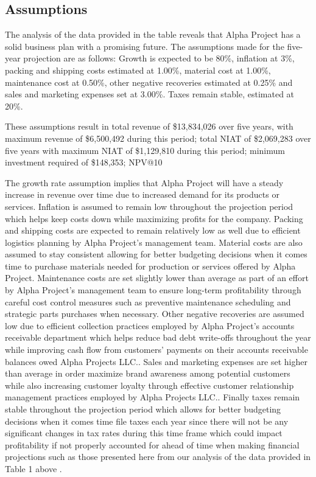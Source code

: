 

\subsection{Assumptions}\label{sec:assumptions}
The analysis of the data provided in the table reveals that Alpha Project has a solid business plan with a promising future. The assumptions made for the five-year projection are as follows: Growth is expected to be 80\%, inflation at 3\%, packing and shipping costs estimated at 1.00\%, material cost at 1.00\%, maintenance cost at 0.50\%, other negative recoveries estimated at 0.25\% and sales and marketing expenses set at 3.00\%. Taxes remain stable, estimated at 20\%. 

These assumptions result in total revenue of \$13,834,026 over five years, with maximum revenue of \$6,500,492 during this period; total NIAT of \$2,069,283 over five years with maximum NIAT of \$1,129,810 during this period; minimum investment required of \$148,353; NPV@10%

The growth rate assumption implies that Alpha Project will have a steady increase in revenue over time due to increased demand for its products or services. Inflation is assumed to remain low throughout the projection period which helps keep costs down while maximizing profits for the company. Packing and shipping costs are expected to remain relatively low as well due to efficient logistics planning by Alpha Project's management team. Material costs are also assumed to stay consistent allowing for better budgeting decisions when it comes time to purchase materials needed for production or services offered by Alpha Project. Maintenance costs are set slightly lower than average as part of an effort by Alpha Project's management team to ensure long-term profitability through careful cost control measures such as preventive maintenance scheduling and strategic parts purchases when necessary. Other negative recoveries are assumed low due to efficient collection practices employed by Alpha Project's accounts receivable department which helps reduce bad debt write-offs throughout the year while improving cash flow from customers' payments on their accounts receivable balances owed Alpha Projects LLC.. Sales and marketing expenses are set higher than average in order maximize brand awareness among potential customers while also increasing customer loyalty through effective customer relationship management practices employed by Alpha Projects LLC.. Finally taxes remain stable throughout the projection period which allows for better budgeting decisions when it comes time file taxes each year since there will not be any significant changes in tax rates during this time frame which could impact profitability if not properly accounted for ahead of time when making financial projections such as those presented here from our analysis of the data provided in Table 1 above . 


